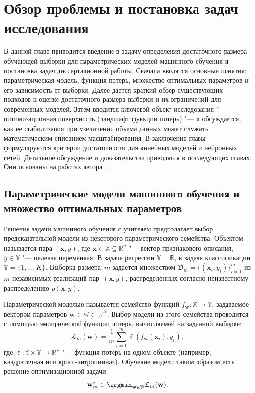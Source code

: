 \chapter{Обзор проблемы и постановка задач исследования}\label{ch:intro}

В данной главе приводится введение в задачу определения достаточного размера обучающей выборки для параметрических моделей машинного обучения и постановка задач диссертационной работы. Сначала вводятся основные понятия: параметрическая модель, функция потерь, множество оптимальных параметров и его зависимость от выборки. Далее дается краткий обзор существующих подходов к оценке достаточного размера выборки и их ограничений для современных моделей. Затем вводится ключевой объект исследования "--- оптимизационная поверхность (ландшафт функции потерь) "--- и обсуждается, как ее стабилизация при увеличении объема данных может служить математическим описанием масштабирования. В заключение главы формулируются критерии достаточности для линейных моделей и нейронных сетей. Детальное обсуждение и доказательства приводятся в последующих главах. Они основаны на работах автора~\cite{kiselev2026ispras,kiselev2025ssdpdp,kiselev2025ssdlb,kiselev2024unraveling}
\cite{kiselev2026conf68mipt,kiselev2025mmro,kiselev2025conf67mipt,meshkov2024convnets,kiselev2024conf66mipt}.

\section{Параметрические модели машинного обучения и множество оптимальных параметров}

Решение задачи машинного обучения с учителем предполагает выбор предсказательной модели из некоторого параметрического семейства. Объектом называется пара $(\mathbf{x}, y)$, где $\mathbf{x} \in \mathbb{X} \subseteq \mathbb{R}^n$ "--- вектор признакового описания, $y \in \mathbb{Y}$ "--- целевая переменная. В задаче регрессии $\mathbb{Y} = \mathbb{R}$, в задаче классификации $\mathbb{Y} = \{1, \ldots, K\}$. Выборка размера~$m$ задается множеством $\mathfrak{D}_m = \{(\mathbf{x}_i, y_i)\}_{i=1}^m$ из $m$ независимых реализаций пар~$(\mathbf{x}, y)$, распределенных согласно неизвестному распределению $p(\mathbf{x}, y)$.

Параметрической моделью называется семейство функций $f_{\mathbf{w}}: \mathbb{X} \to \mathbb{Y}$, задаваемое вектором параметров $\mathbf{w} \in \mathbb{W} \subset \mathbb{R}^N$. Выбор модели из этого семейства проводится с помощью эмпирической функции потерь, вычисляемой на заданной выборке:
\begin{equation}
\label{eq:intro-empirical-loss}
\mathcal{L}_m(\mathbf{w}) = \frac{1}{m} \sum_{i=1}^m \ell(f_{\mathbf{w}}(\mathbf{x}_i), y_i),
\end{equation}
где $\ell: \mathbb{Y} \times \mathbb{Y} \to \mathbb{R}^+$ "--- функция потерь на одном объекте (например, квадратичная или кросс-энтропийная). Обучение модели таким образом есть решение оптимизационной задачи
\begin{equation}
    \label{eq:intro-min-problem}
    \mathbf{w}_m^* \in \argmin_{\mathbf{w} \in \mathbb{W}} \mathcal{L}_m(\mathbf{w}).
\end{equation}

